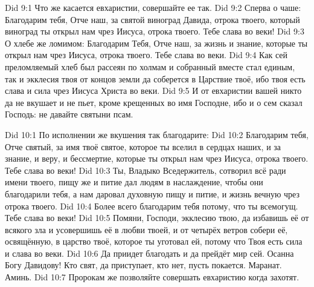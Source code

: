 \vs Did 9:1
Что же касается евхаристии, совершайте ее так.
\vs Did 9:2
Сперва о чаше:
Благодарим тебя, Отче наш, за святой виноград Давида,
отрока твоего, который виноград ты открыл нам чрез Иисуса, отрока твоего.
Тебе слава во веки!
\vs Did 9:3
О хлебе же ломимом: Благодарим Тебя, Отче наш, за жизнь и знание,
которые ты открыл нам чрез Иисуса, отрока твоего.
Тебе слава во веки.
\vs Did 9:4
Как сей преломляемый хлеб был рассеян по холмам и собранный
вместе стал единым, так и экклесия твоя от концов земли
да соберется в Царствие твоё, ибо твоя есть слава и сила
чрез Иисуса Христа во веки.
\vs Did 9:5
И от евхаристии вашей никто да не вкушает и не пьет, кроме
крещенных во имя Господне, ибо и о сем сказал Господь:
не давайте святыни псам.

\vs Did 10:1
По исполнении же вкушения так благодарите:
\vs Did 10:2
Благодарим тебя, Отче святый, за имя твоё святое,
которое ты вселил в сердцах наших,
и за знание, и веру, и бессмертие,
которые ты открыл нам чрез Иисуса, отрока твоего.
Тебе слава во веки!
\vs Did 10:3
Ты, Владыко Вседержитель, сотворил всё ради имени твоего,
пищу же и питие дал людям в наслаждение,
чтобы они благодарили тебя, а нам даровал духовную пищу и питие,
и жизнь вечную чрез отрока твоего.
\vs Did 10:4
Более всего благодарим тебя потому, что ты всемогущ.
Тебе слава во веки!
\vs Did 10:5
Помяни, Господи, экклесию твою, да избавишь её от всякого зла
и усовершишь её в любви твоей, и от четырёх ветров собери её,
освящённую, в царство твоё, которое ты уготовал ей,
потому что Твоя есть сила и слава во веки.
\vs Did 10:6
Да приидет благодать и да прейдёт мир сей.
Осанна Богу Давидову!
Кто свят, да приступает, кто нет, пусть покается.
Маранат. Аминь.
\vs Did 10:7
Пророкам же позволяйте совершать евхаристию когда захотят.

